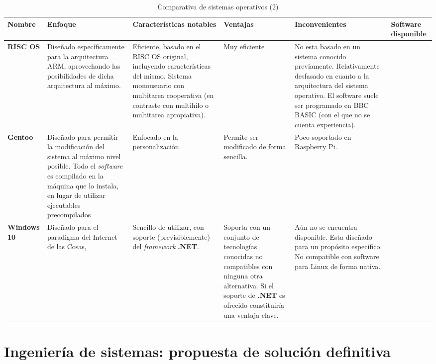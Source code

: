 \begin{landscape}
\begin{table}[h]
\begin{tabular}{|p{2cm}|p{4cm}|p{5cm}|p{3cm}|p{4cm}|p{4cm}|}
\hline
\textbf{Nombre} & \textbf{Enfoque} & \textbf{Características notables} & \textbf{Ventajas} & \textbf{Inconvenientes} & \textbf{Software disponible}\\ \hline

\textbf{RISC OS} & Diseñado específicamente para la arquitectura ARM, aprovechando las posibilidades de dicha arquitectura al máximo. & Eficiente, basado en el RISC OS original, incluyendo características del mismo. Sistema monousuario con multitarea cooperativa (en contraste con multihilo o multitarea apropiativa). & Muy eficiente & No esta basado en un sistema conocido previamente. Relativamente desfasado en cuanto a la arquitectura del sistema operativo. El software suele ser programado en BBC BASIC (con el que no se cuenta experiencia). & \\ \hline

\textbf{Gentoo} & Diseñado para permitir la modificación del sistema al máximo nivel posible. Todo el \textit{software} es compilado en la máquina que lo instala, en lugar de utilizar ejecutables precompilados & Enfocado en la personalización. & Permite ser modificado de forma sencilla. & Poco soportado en Raspberry Pi. & \\ \hline

\textbf{Windows 10} & Diseñado para el paradigma del Internet de las Cosas, & Sencillo de utilizar, con soporte (previsiblemente) del \textit{framework} \textbf{.NET}. & Soporta con un conjunto de tecnologías conocidas no compatibles con ninguna otra alternativa. Si el soporte de \textbf{.NET} es ofrecido constituiría una ventaja clave.  & Aún no se encuentra disponible\cite{windows10raspberry}. Esta diseñado para un propósito especifico. No compatible con software para Linux de forma nativa. & \\ \hline

\end{tabular}
\caption{Comparativa de sistemas operativos (2)}
\end{table}
\end{landscape}


\section{Ingeniería de sistemas: propuesta de solución definitiva}


